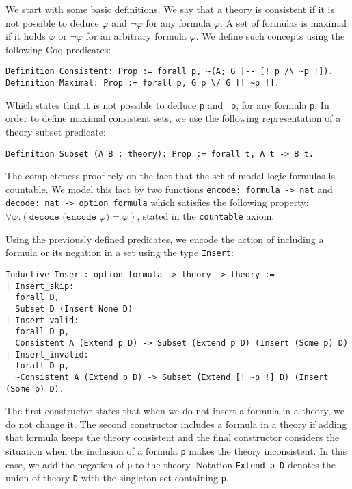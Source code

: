 \documentclass[3p,times]{elsarticle}
\begin{document}
We start with some basic definitions. We say that a theory is consistent if it is not possible to deduce
$\varphi$ and $\neg \varphi$ for any formula $\varphi$. A set of formulas is maximal if it holds $\varphi$ or $\neg \varphi$
for an arbitrary formula $\varphi$. We define such concepts using the following Coq predicates:

\begin{verbatim}
Definition Consistent: Prop := forall p, ~(A; G |-- [! p /\ ~p !]).
Definition Maximal: Prop := forall p, G p \/ G [! ~p !].
\end{verbatim}

Which states that it is not possible to deduce \texttt{p} and \texttt{~p}, for any formula \texttt{p}.
In order to define maximal consistent sets, we use the following representation of a theory
subset predicate:

\begin{verbatim}
Definition Subset (A B : theory): Prop := forall t, A t -> B t.
\end{verbatim}

The completeness proof rely on the fact that the set of modal logic formulas is countable. We model
this fact by two functions \texttt{encode: formula -> nat} and \texttt{decode: nat -> option formula}
which satisfies the following property: $\forall \varphi . (\texttt{decode (encode }\varphi\texttt{)} = \varphi)$, stated in the \texttt{countable} axiom.

Using the previously defined predicates, we encode the action of including a formula or its
negation in a set using the type \texttt{Insert}:

\begin{verbatim}
Inductive Insert: option formula -> theory -> theory :=
| Insert_skip:
  forall D,
  Subset D (Insert None D)
| Insert_valid:
  forall D p,
  Consistent A (Extend p D) -> Subset (Extend p D) (Insert (Some p) D)
| Insert_invalid:
  forall D p,
  ~Consistent A (Extend p D) -> Subset (Extend [! ~p !] D) (Insert (Some p) D).
\end{verbatim}

The first constructor states that when we do not insert a formula in a theory,
we do not change it. The second constructor includes a formula in a theory if
adding that formula keeps the theory consistent and the final constructor considers
the situation when the inclusion of a formula \verb|p| makes the theory inconsistent.
In this case, we add the negation of \verb|p| to the theory. Notation \texttt{Extend p D} denotes the union of theory \texttt{D} with the
singleton set containing \texttt{p}.
\end{document}
